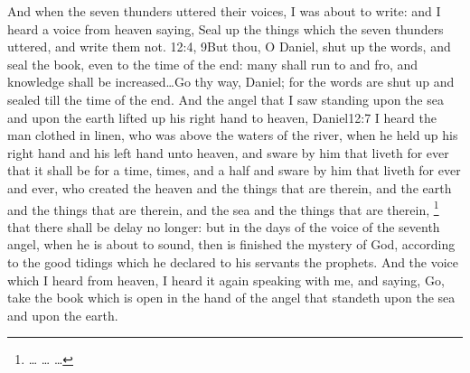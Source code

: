  And when the seven thunders uttered their voices, I was about to write: and I heard a voice from heaven saying, Seal up the things which the seven thunders uttered, and write them not.%
					{12:4, 9}{But thou, O Daniel, shut up the words, and seal the book, even to the time of the end: many shall run to and fro, and knowledge shall be increased\ldots Go thy way, Daniel; for the words are shut up and sealed till the time of the end.}
 And the angel that I saw standing upon the sea and upon the earth lifted up his right hand to heaven,%
					{Daniel}{12:7}{ I heard the man clothed in linen, who was above the waters of the river, when he held up his right hand and his left hand unto heaven, and sware by him that liveth for ever that it shall be for a time, times, and a half}
 and sware by him that liveth for ever and ever, who created the heaven and the things that are therein, and the earth and the things that are therein, and the sea and the things that are therein,%
	\footnote{%
		\ldots%
		\ldots%
		\ldots%
	}
 that there shall be delay no longer: 
 but in the days of the voice of the seventh angel, when he is about to sound, then is finished the mystery of God, according to the good tidings which he declared to his servants the prophets. 
 And the voice which I heard from heaven, I heard it again speaking with me, and saying, Go, take the book which is open in the hand of the angel that standeth upon the sea and upon the earth. 
